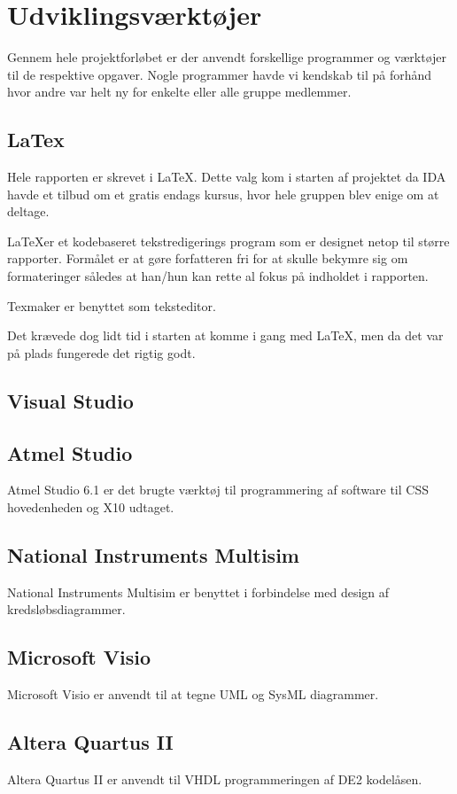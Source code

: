 \chapter{Udviklingsværktøjer}
Gennem hele projektforløbet er der anvendt forskellige programmer og værktøjer til de respektive opgaver. Nogle programmer havde vi kendskab til på forhånd hvor andre var helt ny for enkelte eller alle gruppe medlemmer.

\section{LaTex}
Hele rapporten er skrevet i \LaTeX. Dette valg kom i starten af projektet da IDA havde et tilbud om et gratis endags kursus, hvor hele gruppen blev enige om at deltage. 

\LaTeX er et kodebaseret tekstredigerings program som er designet netop til større rapporter. Formålet er at gøre forfatteren fri for at skulle bekymre sig om formateringer således at han/hun kan rette al fokus på indholdet i rapporten.

Texmaker er benyttet som teksteditor.

Det krævede dog lidt tid i starten at komme i gang med \LaTeX, men da det var på plads fungerede det rigtig godt. 

\section{Visual Studio}

\section{Atmel Studio}
Atmel Studio 6.1 er det brugte værktøj til programmering af software til CSS hovedenheden og X10 udtaget.

\section{National Instruments Multisim}
National Instruments Multisim er benyttet i forbindelse med design af kredsløbsdiagrammer. 

\section{Microsoft Visio} %
Microsoft Visio er anvendt til at tegne UML og SysML diagrammer.

\section{Altera Quartus II}
Altera Quartus II er anvendt til VHDL programmeringen af DE2 kodelåsen.

